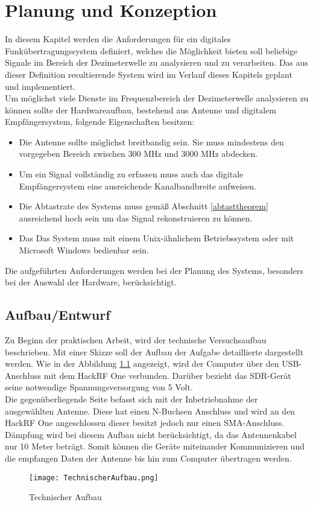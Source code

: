 \chapter{Planung und Konzeption}
In diesem Kapitel werden die Anforderungen für ein digitales Funkübertragungssystem definiert, welches die Möglichkeit bieten soll beliebige Signale im Bereich der Dezimeterwelle zu analysieren und zu verarbeiten. Das aus dieser Definition resultierende System wird im Verlauf dieses Kapitels geplant und implementiert.\\
Um möglichst viele Dienste im Frequenzbereich der Dezimeterwelle analysieren zu können sollte der Hardwareaufbau, bestehend aus Antenne und digitalem Empfängersystem, folgende Eigenschaften besitzen:
\begin{itemize}
	\item Die Antenne sollte möglichst breitbandig sein. Sie muss mindestens den vorgegeben Bereich zwischen 300 MHz und 3000 MHz abdecken.
	\item Um ein Signal vollständig zu erfassen muss auch das digitale Empfängersystem eine ausreichende Kanalbandbreite aufweisen.
	\item Die Abtastrate des Systems muss gemäß Abschnitt \ref{abtasttheorem} ausreichend hoch sein um das Signal rekonstruieren zu können.
	\item Das Das System muss mit einem Unix-ähnlichem Betriebssystem oder mit Microsoft Windows bedienbar sein.
\end{itemize}%

Die aufgeführten Anforderungen werden bei der Planung des Systems, besonders bei der Auswahl der Hardware, berücksichtigt. 

\section{Aufbau/Entwurf}
Zu Beginn der praktischen Arbeit, wird der technische Versuchsaufbau beschrieben. Mit einer Skizze soll der Aufbau der Aufgabe detaillierte dargestellt werden. Wie in der Abbildung \ref{Technischer Aufbau} angezeigt, wird der Computer über den USB-Anschluss mit dem HackRF One verbunden. Darüber bezieht das SDR-Gerät seine notwendige Spannungsversorgung von 5 Volt.\\
Die gegenüberliegende Seite befasst sich mit der Inbetriebnahme der ausgewählten Antenne. Diese hat einen N-Buchsen Anschluss und wird an den HackRF One angeschlossen dieser besitzt jedoch nur einen SMA-Anschluss. Dämpfung wird bei diesem Aufbau nicht berücksichtigt, da das Antennenkabel nur 10 Meter beträgt. Somit können die Geräte miteinander Kommunizieren und die empfangen Daten der Antenne bis hin zum Computer übertragen werden.  
\begin{figure}[H]
	\centering
	\texttt{[image: TechnischerAufbau.png]}
	\caption[Technischer Aufbau]{Technischer Aufbau} 
	\label{Technischer Aufbau}
\end{figure}

